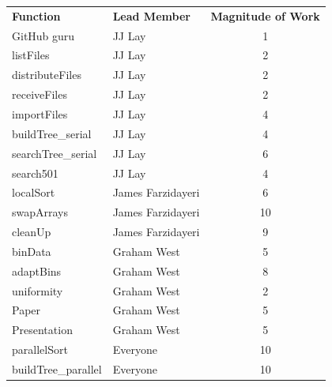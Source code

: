 \documentclass{article}
\begin{document}
\begin{tabular}{l l c}
\textbf{Function}  & \textbf{Lead Member} & \textbf{Magnitude of Work} \\
GitHub guru & JJ Lay & 1 \\
listFiles & JJ Lay & 2 \\
distributeFiles & JJ Lay & 2 \\
receiveFiles & JJ Lay & 2 \\
importFiles & JJ Lay & 4 \\
buildTree\_serial & JJ Lay & 4 \\
searchTree\_serial & JJ Lay & 6 \\
search501 & JJ Lay & 4 \\
localSort & James Farzidayeri & 6 \\
swapArrays & James Farzidayeri & 10 \\
cleanUp & James Farzidayeri & 9 \\
binData & Graham West & 5 \\
adaptBins & Graham West & 8 \\
uniformity & Graham West & 2 \\
Paper & Graham West & 5 \\
Presentation & Graham West & 5 \\
parallelSort & Everyone & 10 \\
buildTree\_parallel & Everyone & 10 \\
\end{tabular} \\

\end{document}
